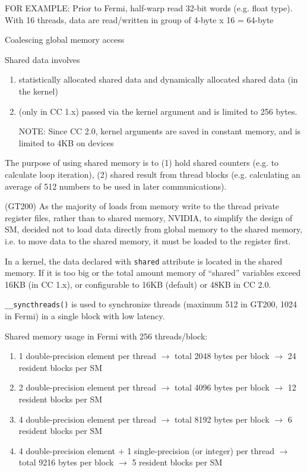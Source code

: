 FOR EXAMPLE: Prior to Fermi, half-warp read 32-bit words (e.g. float
type). With 16 threads, data are read/written in group of 4-byte x 16
= 64-byte

Coalescing global memory access



Shared data involves 
\begin{enumerate}
\item statistically allocated shared data and dynamically allocated
  shared data (in the kernel)
\item (only in CC 1.x) passed via the kernel argument and is limited
  to 256 bytes.

  NOTE: Since CC 2.0, kernel arguments are saved in constant memory, and
  is limited to 4KB on devices 
\end{enumerate}

\begin{framed}
  The purpose of using shared memory is to (1) hold shared counters
  (e.g. to calculate loop iteration), (2) shared result from thread
  blocks (e.g. calculating an average of 512 numbers to be used in
  later communications). 

  (GT200) As the majority of loads from memory write to the thread
  private register files, rather than to shared memory, NVIDIA, to
  simplify the design of SM, decided not to load data directly from
  global memory to the shared memory, i.e. to move data to the shared
  memory, it must be loaded to the register first.
\end{framed}


In a kernel, the data declared with \verb!shared! attribute is located
in the shared memory. If it is too big or the total amount memory of
``shared'' variables exceed 16KB (in CC 1.x), or configurable to 16KB
(default) or 48KB in CC 2.0.

\verb!__syncthreads()! is used to synchronize threads (maximum 512 in
GT200, 1024 in Fermi) in a single block with low latency.

Shared memory usage in Fermi with 256 threads/block:
\begin{enumerate}
\item 1 double-precision element per thread $\rightarrow$ total 2048
  bytes per block $\rightarrow$ 24 resident blocks per SM

\item 2 double-precision element per thread $\rightarrow$ total 4096
  bytes per block $\rightarrow$ 12 resident blocks per SM

\item 4 double-precision element per thread $\rightarrow$ total 8192
  bytes per block $\rightarrow$ 6 resident blocks per SM

\item 4 double-precision element + 1 single-precision (or integer) per
  thread $\rightarrow$ total 9216 bytes per block $\rightarrow$ 5
  resident blocks per SM
\end{enumerate}

